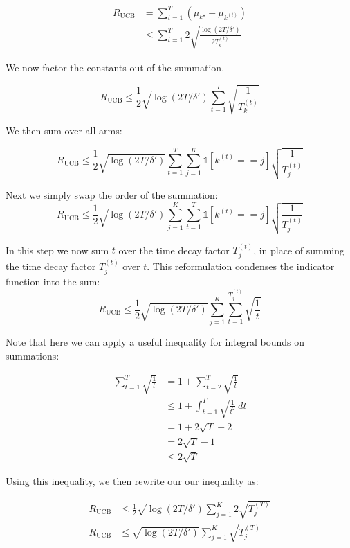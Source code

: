 \documentclass[11pt]{article}
\begin{document}
\begin{align}
    R_{\text{UCB}} &= \sum_{t=1}^T (\mu_{k^{\star}} - \mu_{k^{(t)}}) \\
    &\leq \sum_{t=1}^T 2\sqrt{\frac{\log(2T/\delta')}{2T_k^{(t)}}}
\end{align}

We now factor the constants out of the summation.

\begin{equation}
    R_{\text{UCB}} \leq \frac{1}{2} \sqrt{\log(2T/\delta')} \sum_{t=1}^T \sqrt{\frac{1}{T_k^{(t)}}}
\end{equation}

We then sum over all arms:

\begin{equation}
    R_{\text{UCB}} \leq \frac{1}{2} \sqrt{\log(2T/\delta')} \sum_{t=1}^T \sum_{j=1}^K \mathds{1}[k^{(t)} == j] \sqrt{\frac{1}{T_j^{(t)}}}
\end{equation}

Next we simply swap the order of the summation:
\begin{equation}
    R_{\text{UCB}} \leq \frac{1}{2} \sqrt{\log(2T/\delta')} \sum_{j=1}^K \sum_{t=1}^T \mathds{1}[k^{(t)} == j] \sqrt{\frac{1}{T_j^{(t)}}}
\end{equation}

In this step we now sum $t$ over the time decay factor $T_j^{(t)}$, in place of summing the time decay factor $T_j^{(t)}$ over $t$. This reformulation condenses the indicator function into the sum:
\begin{equation}
    R_{\text{UCB}} \leq \frac{1}{2} \sqrt{\log(2T/\delta')} \sum_{j=1}^K \sum_{t=1}^{T_j^{(t)}} \sqrt{\frac{1}{t}}
\end{equation}

Note that here we can apply a useful inequality for integral bounds on summations:

\begin{align}
    \sum_{t=1}^T \sqrt{\frac{1}{t}} &= 1 + \sum_{t=2}^T \sqrt{\frac{1}{t}} \\
    &\leq 1 + \int_{t=1}^{T} \sqrt{\frac{1}{t^2}} \,dt \\
    &= 1 + 2 \sqrt{T} - 2 \\
    &= 2\sqrt{T} - 1 \\
    &\leq 2 \sqrt{T}
\end{align}

Using this inequality, we then rewrite our our inequality as:

\begin{align}
    R_{\text{UCB}} &\leq \frac{1}{2} \sqrt{\log(2T/\delta')} \sum_{j=1}^K 2 \sqrt{T_j^{(T)}} \\
    R_{\text{UCB}} &\leq \sqrt{\log(2T/\delta')} \sum_{j=1}^K \sqrt{T_j^{(T)}} \\
\end{align}
\end{document}
